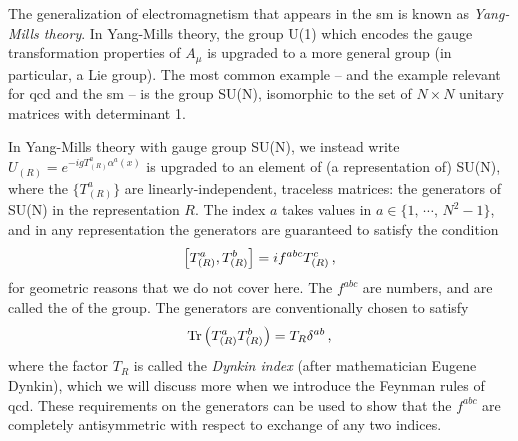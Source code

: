 The generalization of electromagnetism that appears in the \gls{sm} is known as \textit{Yang-Mills theory}.
%
In Yang-Mills theory, the group U(1) which encodes the gauge transformation properties of \(A_\mu\) is upgraded to a more general group (in particular, a Lie group).
%
The most common example -- and the example relevant for \gls{qcd} and the \gls{sm} -- is the group SU(N), isomorphic to the set of \(N\times N\) unitary matrices with determinant 1.



In Yang-Mills theory with gauge group SU(N), we instead write \(U_{(R)} = e^{-i g T_{(R)}^a \alpha^a(x)}\) is upgraded to an element of (a representation of) SU(N), where the \(\{T^a_{(R)}\}\) are linearly-independent, traceless matrices:
%
the generators of SU(N) in the representation \(R\).
%
The index \(a\) takes values in \(a \in \{1,\,\cdots,\,N^2-1\}\), and in any representation the generators are guaranteed to satisfy the condition
\begin{align}
    \comm{T^a_{(R)}}{T^b_{(R)}}
    =
    i f^{abc} T^c_{(R)}
    \,,
\end{align}
for geometric reasons that we do not cover here.
%
The \(f^{abc}\) are numbers, and are called the  of the group.
%
The generators are conventionally chosen to satisfy
\begin{align}
    \Tr\left(T_{(R)}^a T_{(R)}^b\right) = T_R \delta^{ab}
    \,,
\end{align}
where the factor \(T_R\) is called the \textit{Dynkin index} (after mathematician Eugene Dynkin), which we will discuss more when we introduce the Feynman rules of \gls{qcd}.
%
These requirements on the generators can be used to show that the \(f^{abc}\) are completely antisymmetric with respect to exchange of any two indices.


